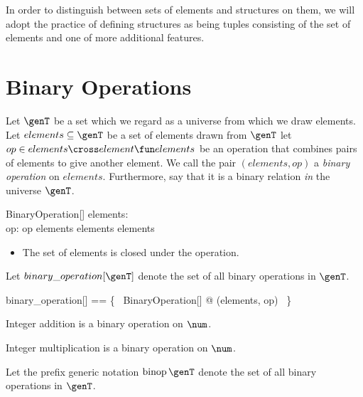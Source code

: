 \documentclass{amsart}
\begin{document}
In order to distinguish between sets of elements and structures on them, 
we will adopt the practice of defining structures as being tuples consisting of the set of elements and one of more additional features.

\section{Binary Operations}

Let $\genT$ be a set which we regard as a universe from which we draw elements.
Let $elements \subseteq \genT$ be a set of elements drawn from $\genT$
let $op \in elements \cross element \fun elements$ be an operation that combines pairs of elements to give another element.
We call the pair $(elements, op)$ a \textit{binary operation} on $elements$.
Furthermore, say that it is a binary relation \textit{in} the universe $\genT$.

\begin{schema}{BinaryOperation}[\genT]
	elements: \power \genT \\
	op: \genT \cross \genT \pfun \genT
\where
	op \in elements \cross elements \fun elements
\end{schema}
\begin{itemize}
	\item The set of elements is closed under the operation.
\end{itemize}

Let $binary\_operation[\genT]$ denote the set of all binary operations in $\genT$.

\begin{zed}
	binary\_operation[\genT] == \{~ BinaryOperation[\genT] @ (elements, op) ~\}
\end{zed}

\begin{example}
Integer addition is a binary operation on $\num$.
\end{example}

\begin{example}
Integer multiplication is a binary operation on $\num$.
\end{example}

Let the prefix generic notation $\binop \genT$ denote the set of all binary operations in $\genT$.
\end{document}
